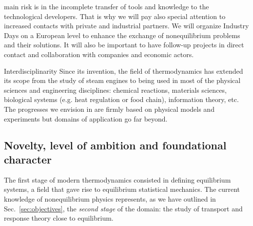 \begin{compactdesc}
main risk is in the incomplete transfer of tools and knowledge to the technological
developers.  That is why we will pay also special attention to increased contacts with
private and industrial partners.  We will organize Industry Days on a European level to
enhance the exchange of nonequilibrium problems and their solutions.  It will also be
important to have follow-up projects in direct contact and collaboration with companies and
economic actors.
\item[Interdisciplinarity] Since its invention, the field of thermodynamics has extended its
scope from the study of steam engines to being used in most of the physical sciences and
engineering disciplines: chemical reactions, materials sciences, biological systems
(e.g. heat regulation or food chain), information theory, etc. The progresses we envision in
\TheProject are firmly based on physical models and experiments but domains of application
go far beyond.
\end{compactdesc}

\subsection{Novelty, level of ambition and foundational character}\label{sec:progress}


The first stage of modern thermodynamics consisted in defining equilibrium systems, a field
that gave rise to equilibrium statistical mechanics. The current knowledge of nonequilibrium
physics represents, as we have outlined in Sec.~\ref{sec:objectives}, the {\em second stage}
of the domain: the study of transport and response theory close to
equilibrium.

